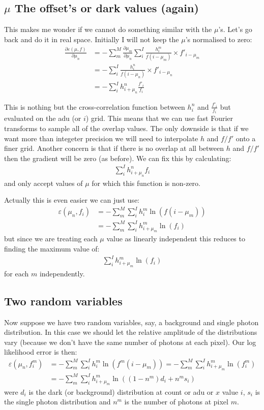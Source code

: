 \documentclass[11pt]{article}
\begin{document}
\subsection{$\mu$ The offset's or dark values (again)}
This makes me wonder if we cannot do something similar with the $\mu$'s. Let's go back and do it in real space. Initially I will not keep the $\mu$'s normalised to zero:
\begin{align}
   \frac{\partial \varepsilon(\mu, f)}{\partial \mu_n} &=-\sum_m^M  \frac{\partial \mu_m}{\partial \mu_n} \sum_i^I \frac{h^m_i}{f(i - \mu_m)} \times f'_{i-\mu_m} \\
   &=-\sum_i^I \frac{h^n_i}{f(i - \mu_n)} \times f'_{i-\mu_n} \\
   &=-\sum_i^I h^n_{i+\mu_n} \frac{f'_i}{f_i}       
   \label{mu_grad_real}
\end{align}

This is nothing but the cross-correlation function between $h^n_{i}$ and $\frac{f'_i}{f_i}$ but evaluated on the adu (or $i$) grid. This means that we can use fast Fourier transforms to sample all of the overlap values. The only downside is that if we want more than integeter precision we will need to interpolate $h$ and $f/f'$ onto a finer grid. Another concern is that if there is no overlap at all between $h$ and $f/f'$ then the gradient will be zero (as before). We can fix this by calculating:
\begin{align}
   \sum_i^I h^n_{i+\mu_n} f_i
\end{align}
and only accept values of $\mu$ for which this function is non-zero.

Actually this is even easier we can just use:
\begin{align}
   \varepsilon(\mu_n, f_i) &= -\sum_m^M \sum_i^I h^m_i \ln(f(i - \mu_m))\\
                           &= -\sum_m^M \sum_i^I h^m_{i + \mu_m} \ln(f_i)
\end{align}
but since we are treating each $\mu$ value as linearly independent this reduces to finding the maximum value of:
\begin{align}
    \sum_i^I h^m_{i + \mu_m} \ln(f_i)
\end{align}
for each $m$ independently. 


\subsection{Two random variables}
Now suppose we have two random variables, say, a background and single photon distribution. In this case we should let the relative amplitude of the distributions vary (because we don't have the same number of photons at each pixel). Our log likelihood error is then:
\begin{align}
   \varepsilon(\mu_n, f^m_i) &= -\sum_m^M \sum_i^I h^m_i \ln(f^m(i - \mu_m)) = -\sum_m^M \sum_i^I h^m_{i+\mu_m} \ln(f^m_i) \\
   &= -\sum_m^M \sum_i^I h^m_{i+\mu_m} \ln((1-n^m)d_i + n^m s_i)
\end{align}
were $d_i$ is the dark (or background) distribution at count or adu or $x$ value $i$, $s_i$ is the single photon distribution and $n^m$ is the number of photons at pixel $m$. 
\end{document}
